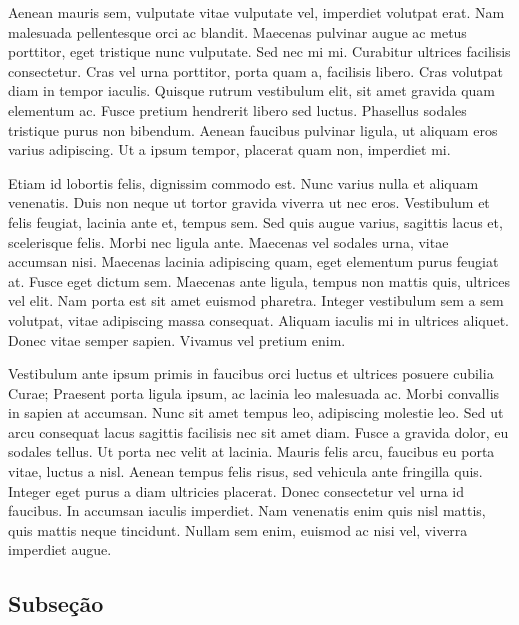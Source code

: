 Aenean mauris sem, vulputate vitae vulputate vel, imperdiet volutpat erat. Nam malesuada pellentesque orci ac blandit. Maecenas pulvinar augue ac metus porttitor, eget tristique nunc vulputate. Sed nec mi mi. Curabitur ultrices facilisis consectetur. Cras vel urna porttitor, porta quam a, facilisis libero. Cras volutpat diam in tempor iaculis. Quisque rutrum vestibulum elit, sit amet gravida quam elementum ac. Fusce pretium hendrerit libero sed luctus. Phasellus sodales tristique purus non bibendum. Aenean faucibus pulvinar ligula, ut aliquam eros varius adipiscing. Ut a ipsum tempor, placerat quam non, imperdiet mi.


Etiam id lobortis felis, dignissim commodo est. Nunc varius nulla et aliquam venenatis. Duis non neque ut tortor gravida viverra ut nec eros. Vestibulum et felis feugiat, lacinia ante et, tempus sem. Sed quis augue varius, sagittis lacus et, scelerisque felis. Morbi nec ligula ante. Maecenas vel sodales urna, vitae accumsan nisi. Maecenas lacinia adipiscing quam, eget elementum purus feugiat at. Fusce eget dictum sem. Maecenas ante ligula, tempus non mattis quis, ultrices vel elit. Nam porta est sit amet euismod pharetra. Integer vestibulum sem a sem volutpat, vitae adipiscing massa consequat. Aliquam iaculis mi in ultrices aliquet. Donec vitae semper sapien. Vivamus vel pretium enim.

Vestibulum ante ipsum primis in faucibus orci luctus et ultrices posuere cubilia Curae; Praesent porta ligula ipsum, ac lacinia leo malesuada ac. Morbi convallis in sapien at accumsan. Nunc sit amet tempus leo, adipiscing molestie leo. Sed ut arcu consequat lacus sagittis facilisis nec sit amet diam. Fusce a gravida dolor, eu sodales tellus. Ut porta nec velit at lacinia. Mauris felis arcu, faucibus eu porta vitae, luctus a nisl. Aenean tempus felis risus, sed vehicula ante fringilla quis. Integer eget purus a diam ultricies placerat. Donec consectetur vel urna id faucibus. In accumsan iaculis imperdiet. Nam venenatis enim quis nisl mattis, quis mattis neque tincidunt. Nullam sem enim, euismod ac nisi vel, viverra imperdiet augue.

\subsection{Subse\c{c}\~{a}o}
\label{sec:subsec01}

